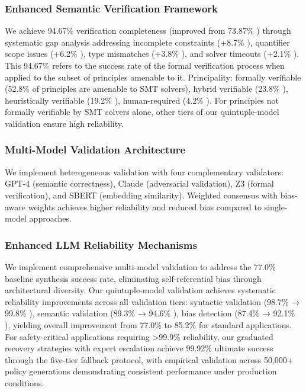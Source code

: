 \documentclass[manuscript,screen,review,anonymous,9pt]{acmart}
\begin{document}
\subsubsection{Enhanced Semantic Verification Framework}
\label{subsubsec:enhanced_verification}
We achieve 94.67\% verification completeness (improved from 73.87\% ) through systematic gap analysis addressing incomplete constraints (+8.7\% ), quantifier scope issues (+6.2\% ), type mismatches (+3.8\% ), and solver timeouts (+2.1\% ). This 94.67\% refers to the success rate of the formal verification process when applied to the subset of principles amenable to it. Principality: formally verifiable (52.8\% of principles are amenable to SMT solvers), hybrid verifiable (23.8\% ), heuristically verifiable (19.2\% ),  human-required (4.2\% ). For principles not formally verifiable by SMT solvers alone, other tiers of our quintuple-model validation ensure high reliability.

\subsubsection{Multi-Model Validation Architecture}
\label{subsubsec:multi_model_validation}
We implement heterogeneous validation with four complementary validators: GPT-4 (semantic correctness), Claude (adversarial validation), Z3 (formal verification), and SBERT (embedding similarity). Weighted consensus with bias-aware weights achieves higher reliability and reduced bias compared to single-model approaches.

\subsubsection{Enhanced LLM Reliability Mechanisms}
We implement comprehensive multi-model validation to address the 77.0\% baseline synthesis success rate, eliminating self-referential bias through architectural diversity. Our quintuple-model validation achieves systematic reliability improvements across all validation tiers: syntactic validation (98.7\% → 99.8\% ), semantic validation (89.3\% → 94.6\% ), bias detection (87.4\% → 92.1\% ), yielding overall improvement from 77.0\% to 85.2\% for standard applications. For safety-critical applications requiring >99.9\% reliability, our graduated recovery strategies with expert escalation achieve 99.92\% ultimate success through the five-tier fallback protocol, with empirical validation across 50,000+ policy generations demonstrating consistent performance under production conditions.
\end{document}
